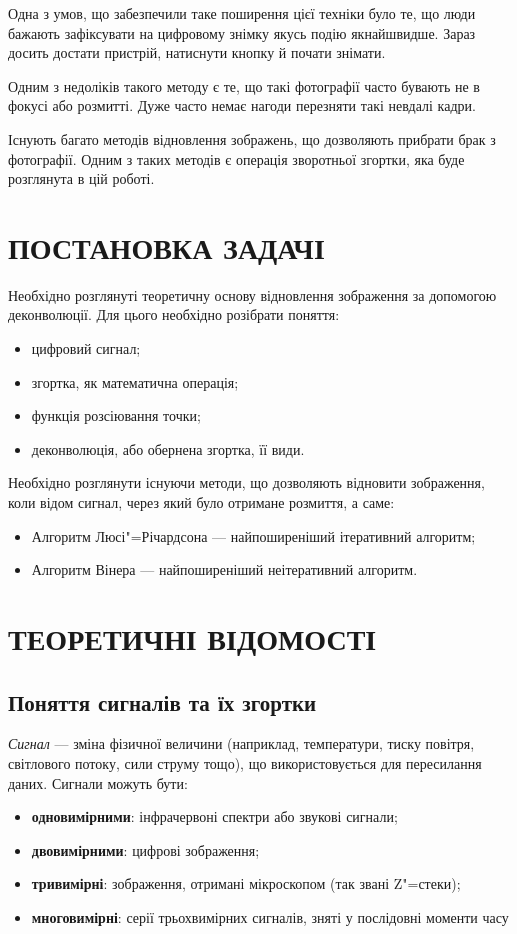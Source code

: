 \documentclass[simple,14pt,utf8,ukrainian]{eskdtext}
\begin{document}
  Одна з умов, що забезпечили таке поширення цієї техніки було те, що люди
  бажають зафіксувати на цифровому знімку якусь подію якнайшвидше.
  Зараз досить достати пристрій, натиснути кнопку й почати знімати.

  Одним з недоліків такого методу є те, що такі фотографії часто бувають
  не в фокусі або розмитті.
  Дуже часто немає нагоди перезняти такі невдалі кадри.

  Існують багато методів відновлення зображень, що дозволяють прибрати брак з
  фотографії.
  Одним з таких методів є операція зворотньої згортки, яка буде розглянута в
  цій роботі.
  \clearpage

\section{ПОСТАНОВКА ЗАДАЧІ}
  Необхідно розглянуті теоретичну основу відновлення зображення за допомогою
  деконволюції.
  Для цього необхідно розібрати поняття:
  \begin{itemize}
    \item цифровий сигнал;
    \item згортка, як математична операція;
    \item функція розсіювання точки;
    \item деконволюція, або обернена згортка, її види.
  \end{itemize}

  Необхідно розглянути існуючи методи, що дозволяють відновити зображення,
  коли відом сигнал, через який було отримане розмиття, а саме:
  \begin{itemize}
    \item Алгоритм Люсі"=Річардсона --- найпоширеніший ітеративний алгоритм;
    \item Алгоритм Вінера --- найпоширеніший неітеративний алгоритм.
  \end{itemize}
  \clearpage

\section{ТЕОРЕТИЧНІ ВІДОМОСТІ}
  \subsection{Поняття сигналів та їх згортки}
    \emph{Сигнал} --- зміна фізичної величини (наприклад, температури, тиску
    повітря, світлового потоку, сили струму тощо), що використовується для
    пересилання даних.
    Сигнали можуть бути:
    \begin{itemize}
      \item \textbf{одновимірними}: інфрачервоні спектри або звукові сигнали;
      \item \textbf{двовимірними}: цифрові зображення;
      \item \textbf{тривимірні}: зображення, отримані мікроскопом (так звані
        Z"=стеки);
      \item \textbf{многовимірні}: серії трьохвимірних сигналів, зняті у
        послідовні моменти часу
    \end{itemize}
\end{document}
